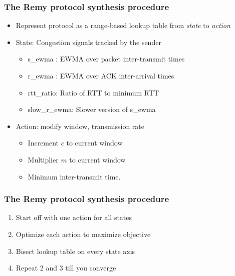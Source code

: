 \begin{frame}
\frametitle{The Remy protocol synthesis procedure}
\begin{itemize}
\item<1-> Represent protocol as a range-based lookup table from \textit{state} to \textit{action}
\item<2-> State: Congestion signals tracked by the sender
\begin{itemize}
\item s\_ewma : EWMA over packet inter-transmit times
\item r\_ewma : EWMA over ACK inter-arrival times
\item rtt\_ratio: Ratio of RTT to minimum RTT
\item slow\_r\_ewma: Slower version of s\_ewma
\end{itemize}
\item<3-> Action: modify window, transmission rate
\begin{itemize}
\item Increment $c$ to current window
\item Multiplier $m$ to current window
\item Minimum inter-transmit time.
\end{itemize}
\end{itemize}
\end{frame}

\begin{frame}
\frametitle{The Remy protocol synthesis procedure}
\begin{enumerate}
\item Start off with one action for all states
\item Optimize each action to maximize objective
\item Bisect lookup table on every state axis
\item Repeat 2 and 3 till you converge
\end{enumerate}
\end{frame}

